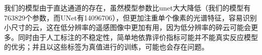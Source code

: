 \documentclass[UTF8]{ctexart}
\begin{document}
我们的模型由于直达通道的存在，虽然模型参数比unet大大降低（我们的模型有763829个参数，而UNet有14096706），但更加注重单个像素的光谱特征，容易识别小尺寸的云，这在低分辨率的遥感图像中更加有用，因为低分辨率的碎云可能会更多。同时由于人工标注的不稳定性，简单地依靠评价指标可能并不能真实反应模型的优劣；并且以这些标签为真值进行的训练，可能也会存在问题。

\begin{figure}[H]
    \centering
\end{figure}
\end{document}
